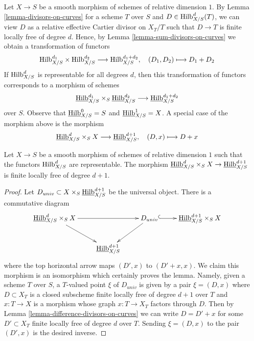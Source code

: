 \noindent
Let $X \to S$ be a smooth morphism of schemes of relative dimension $1$.
By Lemma \ref{lemma-divisors-on-curves} for a scheme $T$ over $S$ and
$D \in \mathrm{Hilb}^d_{X/S}(T)$, we can view $D$ as a relative
effective Cartier divisor on $X_T/T$ such that $D \to T$ is finite
locally free of degree $d$. Hence, by
Lemma \ref{lemma-sum-divisors-on-curves} we obtain a transformation
of functors
$$
\mathrm{Hilb}^{d_1}_{X/S} \times \mathrm{Hilb}^{d_2}_{X/S}
\longrightarrow
\mathrm{Hilb}^{d_1 + d_2}_{X/S},\quad
(D_1, D_2) \longmapsto D_1 + D_2
$$
If $\mathrm{Hilb}^d_{X/S}$ is representable for all degrees $d$, then
this transformation of functors corresponds to a morphism of schemes
$$
\underline{\mathrm{Hilb}}^{d_1}_{X/S}
\times_S
\underline{\mathrm{Hilb}}^{d_2}_{X/S}
\longrightarrow
\underline{\mathrm{Hilb}}^{d_1 + d_2}_{X/S}
$$
over $S$. Observe that $\underline{\mathrm{Hilb}}^0_{X/S} = S$ and
$\underline{\mathrm{Hilb}}^1_{X/S} = X$.
A special case of the morphism above is the morphism
$$
\underline{\mathrm{Hilb}}^d_{X/S} \times_S X
\longrightarrow
\underline{\mathrm{Hilb}}^{d + 1}_{X/S},\quad
(D, x) \longmapsto D + x
$$

\begin{lemma}
\label{lemma-universal-object}
Let $X \to S$ be a smooth morphism of schemes of relative dimension $1$
such that the functors $\mathrm{Hilb}^d_{X/S}$ are representable. The morphism
$\underline{\mathrm{Hilb}}^d_{X/S} \times_S X \to
\underline{\mathrm{Hilb}}^{d + 1}_{X/S}$
is finite locally free of degree $d + 1$.
\end{lemma}

\begin{proof}
Let $D_{univ} \subset X \times_S \underline{\mathrm{Hilb}}^{d + 1}_{X/S}$
be the universal object. There is a commutative diagram
$$
\xymatrix{
\underline{\Hilbfunctor}^d_{X/S} \times_S X \ar[rr] \ar[rd] & &
D_{univ} \ar[ld] \ar@{^{(}->}[r] &
\underline{\Hilbfunctor}^{d + 1}_{X/S} \times_S X \\
& \underline{\Hilbfunctor}^{d + 1}_{X/S}
}
$$
where the top horizontal arrow maps $(D', x)$ to $(D' + x, x)$.
We claim this morphism is an isomorphism
which certainly proves the lemma. Namely, given a scheme $T$ over $S$,
a $T$-valued point $\xi$ of $D_{univ}$ is given by a pair $\xi = (D, x)$
where $D \subset X_T$ is a closed subscheme finite locally free
of degree $d + 1$ over $T$ and $x : T \to X$ is a morphism whose
graph $x : T \to X_T$ factors through $D$. Then by
Lemma \ref{lemma-difference-divisors-on-curves}
we can write $D = D' + x$ for some $D' \subset X_T$ finite locally
free of degree $d$ over $T$. Sending $\xi = (D, x)$ to the pair
$(D', x)$ is the desired inverse.
\end{proof}

